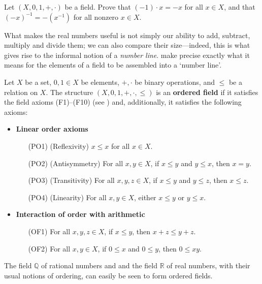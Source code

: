 \begin{exercise}
\label{exMinusOneSquaredIsOne}
Let $(X,0,1,+,{\cdot})$ be a field. Prove that $(-1) \cdot x = -x$ for all $x \in X$, and that $(-x)^{-1} = -(x^{-1})$ for all nonzero $x \in X$.
\end{exercise}

What makes the real numbers useful is not simply our ability to add, subtract, multiply and divide them; we can also compare their size---indeed, this is what gives rise to the informal notion of a \textit{number line}.  make precise exactly what it means for the elements of a field to be assembled into a `number line'.

\begin{axioms}
\label{axOrderedField}
Let $X$ be a set, $0,1 \in X$ be elements, $+,{\cdot}$ be binary operations, and $\le$ be a relation on $X$. The structure $(X,0,1,+,{\cdot},{\le})$ is an \textbf{ordered field} if it satisfies the field axioms (F1)--(F10) (see ) and, additionally, it satisfies the following axioms:
\begin{itemize}
\item \textbf{Linear order axioms}
\begin{itemize}[leftmargin=30pt]
\item[(PO1)] (Reflexivity) $x \le x$ for all $x \in X$.
\item[(PO2)] (Antisymmetry) For all $x,y \in X$, if $x \le y$ and $y \le x$, then $x=y$.
\item[(PO3)] (Transitivity) For all $x,y,z \in X$, if $x \le y$ and $y \le z$, then $x \le z$.
\item[(PO4)] (Linearity) For all $x,y \in X$, either $x \le y$ or $y \le x$.
\end{itemize}
\item \textbf{Interaction of order with arithmetic}
\begin{itemize}[leftmargin=30pt]
\item[(OF1)] For all $x,y,z \in X$, if $x \le y$, then $x+z \le y+z$.
\item[(OF2)] For all $x,y \in X$, if $0 \le x$ and $0 \le y$, then $0 \le xy$. 
\end{itemize}
\end{itemize}
\end{axioms}

\begin{example}
\label{exQRAreOrderedFields}
The field $\mathbb{Q}$ of rational numbers and and the field $\mathbb{R}$ of real numbers, with their usual notions of ordering, can easily be seen to form ordered fields.
\end{example}

